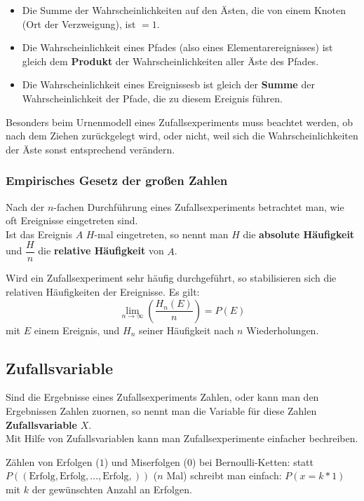\documentclass[main.tex]{subfiles}
\begin{document}
\begin{Definition}[Pfadregeln]
  \begin{itemize}
    \item Die Summe der Wahrscheinlichkeiten auf den Ästen, die von einem Knoten (Ort der Verzweigung), ist $=1$.
    \item Die Wahrscheinlichkeit eines Pfades (also eines Elementarereignisses) ist gleich dem \textbf{Produkt} der Wahrscheinlichkeiten aller Äste des Pfades.
    \item Die Wahrscheinlichkeit eines Ereignissesb ist gleich der \textbf{Summe} der Wahrscheinlichkeit der Pfade, die zu diesem Ereignis führen.
  \end{itemize}
\end{Definition}
\begin{Bemerkung}
  Besonders beim Urnenmodell eines Zufallsexperiments muss beachtet werden, ob nach dem Ziehen zurückgelegt wird, oder nicht, weil sich die Wahrscheinlichkeiten der Äste sonst entsprechend verändern.
\end{Bemerkung}

\subsubsection{Empirisches Gesetz der großen Zahlen}
\begin{Definition}[Häufigkeiten]
  Nach der $n$-fachen Durchführung eines Zufallsexperiments betrachtet man, wie oft Ereignisse eingetreten sind.\\
  Ist das Ereignis $A$ $H$-mal eingetreten, so nennt man $H$ die \textbf{absolute Häufigkeit} und $\dfrac{H}{n}$ die \textbf{relative Häufigkeit} von $A$.
\end{Definition}
\begin{Theorem}
  Wird ein Zufallsexperiment sehr häufig durchgeführt, so stabilisieren sich die relativen Häufigkeiten der Ereignisse. Es gilt:
  $$\lim_{n\to \infty} \left(\dfrac{H_n(E)}{n}\right) = P(E)$$mit $E$ einem Ereignis, und $H_n$ seiner Häufigkeit nach $n$ Wiederholungen.
\end{Theorem}



\subsection{Zufallsvariable}
\begin{Definition}
  Sind die Ergebnisse eines Zufallsexperiments Zahlen, oder kann man den Ergebnissen Zahlen zuornen, so nennt man die Variable für diese Zahlen \textbf{Zufallsvariable} $X$.\\
  Mit Hilfe von Zufallsvariablen kann man Zufallsexperimente einfacher bechreiben.
\end{Definition}
\begin{Beispiel}
  Zählen von Erfolgen ($1$) und Miserfolgen ($0$) bei Bernoulli-Ketten: statt $P((\text{Erfolg},\text{Erfolg},...,\text{Erfolg},))$ ($n$ Mal) schreibt man einfach: $P(x=k*1)$ mit $k$ der gewünschten Anzahl an Erfolgen.
\end{Beispiel}
\end{document}
